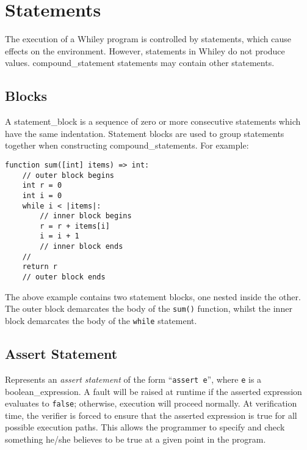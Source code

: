 \chapter{Statements}

The execution of a Whiley program is controlled by \gls{statement}s, which cause effects on the environment.  However, statements in Whiley do not produce values.  \Gls{compound_statement} statements may contain other statements.

\section{Blocks}
\label{c_stmts_blocks}

A \gls{statement_block} is a sequence of zero or more consecutive statements which have the same indentation.  Statement blocks are used to group statements together when constructing \gls{compound_statement}s.  For example:
\begin{lstlisting}
function sum([int] items) => int:
    // outer block begins
    int r = 0
    int i = 0
    while i < |items|:
        // inner block begins
        r = r + items[i]
        i = i + 1
        // inner block ends
    //
    return r
    // outer block ends
\end{lstlisting}

The above example contains two statement blocks, one nested inside the other.  The outer block demarcates the body of the \lstinline{sum()} function, whilst the inner block demarcates the body of the \lstinline{while} statement.


\section{Assert Statement}

Represents an {\em assert statement} of the form ``\lstinline{assert e}'', where \lstinline{e} is a \gls{boolean_expression}.  A \gls{fault} will be raised at runtime if the asserted expression evaluates to \lstinline{false}; otherwise, execution will proceed normally.  At verification time, the verifier is forced to ensure that the asserted expression is true for all possible execution paths.  This allows the programmer to specify and check something he/she believes to be true at a given point in the program.

